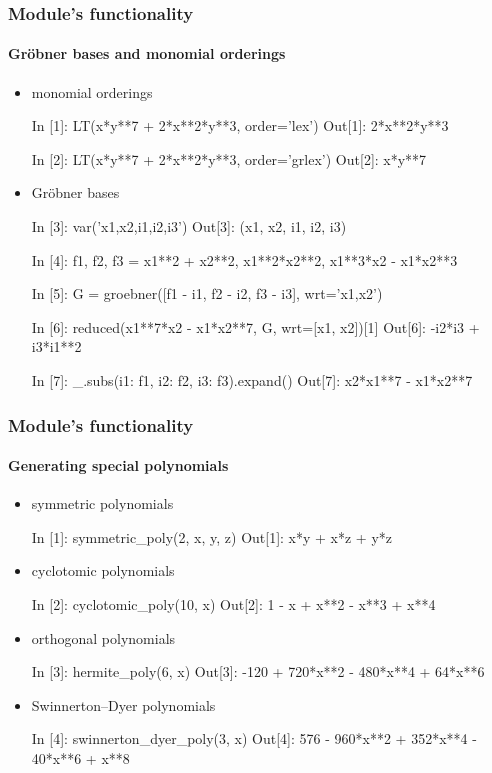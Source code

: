 \documentclass[10pt,polish]{beamer}
\begin{document}
\begin{frame}[fragile]
    \frametitle{Module's functionality}
    \framesubtitle{Gr\"{o}bner bases and monomial orderings}

    \begin{itemize}
        \item monomial orderings
            \begin{python}
In [1]: LT(x*y**7 + 2*x**2*y**3, order='lex')
Out[1]: 2*x**2*y**3

In [2]: LT(x*y**7 + 2*x**2*y**3, order='grlex')
Out[2]: x*y**7
            \end{python}
        \item Gr\"{o}bner bases
            \begin{python}
In [3]: var('x1,x2,i1,i2,i3')
Out[3]: (x1, x2, i1, i2, i3)

In [4]: f1, f2, f3 = x1**2 + x2**2, x1**2*x2**2, x1**3*x2 - x1*x2**3

In [5]: G = groebner([f1 - i1, f2 - i2, f3 - i3], wrt='x1,x2')

In [6]: reduced(x1**7*x2 - x1*x2**7, G, wrt=[x1, x2])[1]
Out[6]: -i2*i3 + i3*i1**2

In [7]: _.subs({i1: f1, i2: f2, i3: f3}).expand()
Out[7]: x2*x1**7 - x1*x2**7
            \end{python}
    \end{itemize}
\end{frame}

\begin{frame}[fragile]
    \frametitle{Module's functionality}
    \framesubtitle{Generating special polynomials}

    \begin{itemize}
        \item symmetric polynomials
            \begin{python}
In [1]: symmetric_poly(2, x, y, z)
Out[1]: x*y + x*z + y*z
            \end{python}
        \item cyclotomic polynomials
            \begin{python}
In [2]: cyclotomic_poly(10, x)
Out[2]: 1 - x + x**2 - x**3 + x**4
            \end{python}
        \item orthogonal polynomials
            \begin{python}
In [3]: hermite_poly(6, x)
Out[3]: -120 + 720*x**2 - 480*x**4 + 64*x**6
            \end{python}
        \item Swinnerton--Dyer polynomials
            \begin{python}
In [4]: swinnerton_dyer_poly(3, x)
Out[4]: 576 - 960*x**2 + 352*x**4 - 40*x**6 + x**8
            \end{python}
    \end{itemize}
\end{frame}
\end{document}
